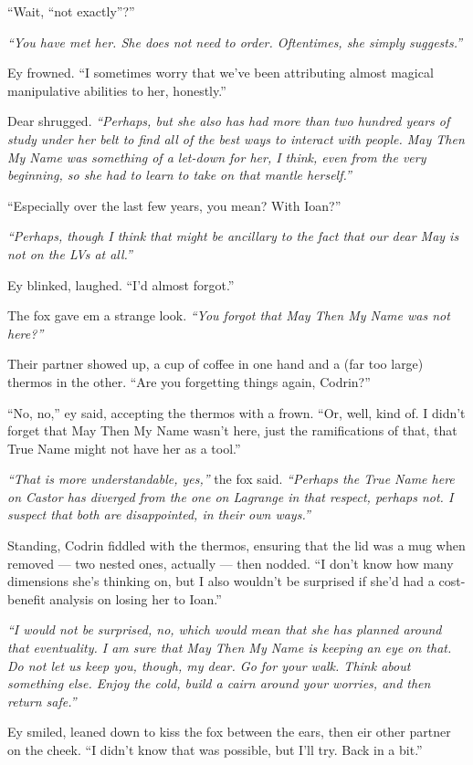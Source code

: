 ``Wait, ``not exactly''?''

\emph{``You have met her. She does not need to order. Oftentimes, she simply suggests.''}

Ey frowned. ``I sometimes worry that we've been attributing almost magical manipulative abilities to her, honestly.''

Dear shrugged. \emph{``Perhaps, but she also has had more than two hundred years of study under her belt to find all of the best ways to interact with people. May Then My Name was something of a let-down for her, I think, even from the very beginning, so she had to learn to take on that mantle herself.''}

``Especially over the last few years, you mean? With Ioan?''

\emph{``Perhaps, though I think that might be ancillary to the fact that our dear May is not on the LVs at all.''}

Ey blinked, laughed. ``I'd almost forgot.''

The fox gave em a strange look. \emph{``You forgot that May Then My Name was not here?''}

Their partner showed up, a cup of coffee in one hand and a (far too large) thermos in the other. ``Are you forgetting things again, Codrin?''

``No, no,'' ey said, accepting the thermos with a frown. ``Or, well, kind of. I didn't forget that May Then My Name wasn't here, just the ramifications of that, that True Name might not have her as a tool.''

\emph{``That is more understandable, yes,''} the fox said. \emph{``Perhaps the True Name here on Castor has diverged from the one on Lagrange in that respect, perhaps not. I suspect that both are disappointed, in their own ways.''}

Standing, Codrin fiddled with the thermos, ensuring that the lid was a mug when removed — two nested ones, actually — then nodded. ``I don't know how many dimensions she's thinking on, but I also wouldn't be surprised if she'd had a cost-benefit analysis on losing her to Ioan.''

\emph{``I would not be surprised, no, which would mean that she has planned around that eventuality. I am sure that May Then My Name is keeping an eye on that. Do not let us keep you, though, my dear. Go for your walk. Think about something else. Enjoy the cold, build a cairn around your worries, and then return safe.''}

Ey smiled, leaned down to kiss the fox between the ears, then eir other partner on the cheek. ``I didn't know that was possible, but I'll try. Back in a bit.''

